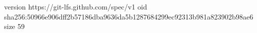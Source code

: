 version https://git-lfs.github.com/spec/v1
oid sha256:50966e906dff2b57186dba9636da5b1287684299ec92313b981a823902b98ae6
size 59
